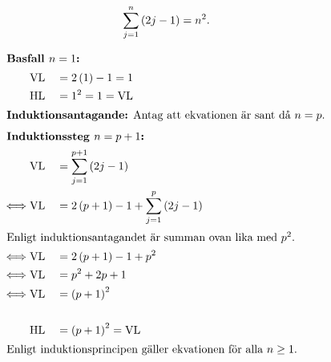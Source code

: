 \[\sum_{j=1}^{n}\paren{2j-1}=n^{2}.\]

\begin{alignat*}{2}
  \intertext{
\textbf{Basfall $n=1$:}
  }
  &\VL &&= 2\paren{1}-1 = 1 \\
  &\HL &&= 1^{2} = 1 = \VL \\
  \intertext{
\textbf{Induktionsantagande:} Antag att ekvationen är sant då $n=p$.
  }
  \intertext{
\textbf{Induktionssteg $n=p+1$:}
  }
  &\VL &&= \sum_{j=1}^{p+1}\paren{2j-1} \\
  \iff&\VL &&= 2\paren{p+1}-1 + \sum_{j=1}^{p}\paren{2j-1} \\
  \intertext{
Enligt induktionsantagandet är summan ovan lika med $p^{2}$.
  }
  \iff&\VL &&= 2\paren{p+1}-1 + p^{2} \\
  \iff&\VL &&= p^{2}+2p+1 \\
  \iff&\VL &&= \paren{p+1}^{2} \\
  \\
  &\HL &&= \paren{p+1}^{2} = \VL \\
  \intertext{
Enligt induktionsprincipen gäller ekvationen för alla $n\geq1$.
  }
\end{alignat*}
